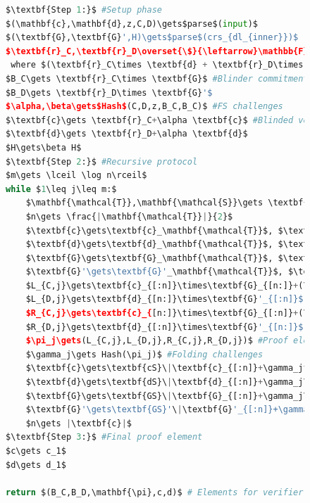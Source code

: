 \begin{figure}[!htb]
    \begin{lstlisting}[language=Python,mathescape=true,label={lst:ipa-prover},numbers=right,caption={Prover computation for CAAU-IPA in CAAUrdleproofs},captionpos=b,frame=single]
$\textbf{Step 1:}$ #Setup phase
$(\mathbf{c},\mathbf{d},z,C,D)\gets$parse$(input)$
$(\textbf{G},\textbf{G}',H)\gets$parse$(crs_{dl_{inner}})$
$\textbf{r}_C,\textbf{r}_D\overset{\$}{\leftarrow}\mathbb{F}^n$ #Vector blinders
 where $(\textbf{r}_C\times \textbf{d} + \textbf{r}_D\times \textbf{c})=0\text{ and }\textbf{r}_C\times \textbf{r}_D=0$
$B_C\gets \textbf{r}_C\times \textbf{G}$ #Blinder commitments
$B_D\gets \textbf{r}_D\times \textbf{G}'$
$\alpha,\beta\gets$Hash$(C,D,z,B_C,B_C)$ #FS challenges
$\textbf{c}\gets \textbf{r}_C+\alpha \textbf{c}$ #Blinded vectors
$\textbf{d}\gets \textbf{r}_D+\alpha \textbf{d}$
$H\gets\beta H$
$\textbf{Step 2:}$ #Recursive protocol
$m\gets \lceil \log n\rceil$
while $1\leq j\leq m:$
    $\mathbf{\mathcal{T}},\mathbf{\mathcal{S}}\gets \textbf{\textit{f(}}n\textbf{\textit{)}}$ #Scheme function
    $n\gets \frac{|\mathbf{\mathcal{T}}|}{2}$
    $\textbf{c}\gets\textbf{c}_\mathbf{\mathcal{T}}$, $\textbf{cS}\gets\textbf{c}_\mathbf{\mathcal{S}}$ #Vector splitting
    $\textbf{d}\gets\textbf{d}_\mathbf{\mathcal{T}}$, $\textbf{dS}\gets\textbf{d}_\mathbf{\mathcal{S}}$
    $\textbf{G}\gets\textbf{G}_\mathbf{\mathcal{T}}$, $\textbf{GS}\gets\textbf{G}_\mathbf{\mathcal{S}}$
    $\textbf{G}'\gets\textbf{G}'_\mathbf{\mathcal{T}}$, $\textbf{GS}'\gets\textbf{G}'_\mathbf{\mathcal{S}}$
    $L_{C,j}\gets\textbf{c}_{[:n]}\times\textbf{G}_{[n:]}+(\textbf{c}_{[:n]}\times\textbf{d}_{[n:]})H$ #Cross-comm
    $L_{D,j}\gets\textbf{d}_{[n:]}\times\textbf{G}'_{[:n]}$
    $R_{C,j}\gets\textbf{c}_{[n:]}\times\textbf{G}_{[:n]}+(\textbf{c}_{[n:]}\times\textbf{d}_{[:n]})H$
    $R_{D,j}\gets\textbf{d}_{[:n]}\times\textbf{G}'_{[n:]}$
    $\pi_j\gets(L_{C,j},L_{D,j},R_{C,j},R_{D,j})$ #Proof elements
    $\gamma_j\gets Hash(\pi_j)$ #Folding challenges
    $\textbf{c}\gets\textbf{cS}\|\textbf{c}_{[:n]}+\gamma_j^{-1}\textbf{c}_{[n:]}$ #Next round vectors
    $\textbf{d}\gets\textbf{dS}\|\textbf{d}_{[:n]}+\gamma_j\textbf{d}_{[n:]}$
    $\textbf{G}\gets\textbf{GS}\|\textbf{G}_{[:n]}+\gamma_j\textbf{G}_{[n:]}$
    $\textbf{G}'\gets\textbf{GS}'\|\textbf{G}'_{[:n]}+\gamma_j^{-1}\textbf{G}'_{[n:]}$
    $n\gets |\textbf{c}|$
$\textbf{Step 3:}$ #Final proof element
$c\gets c_1$
$d\gets d_1$

return $(B_C,B_D,\mathbf{\pi},c,d)$ # Elements for verifier
    \end{lstlisting}
\label{fig:ipa-prover}
\end{figure}
